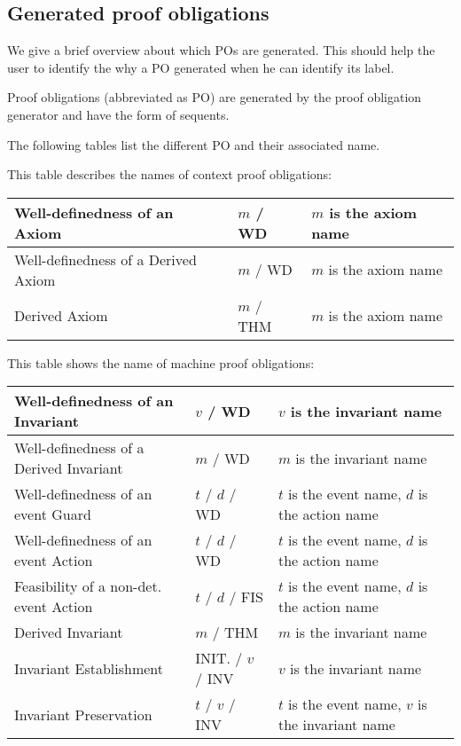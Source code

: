   
\subsection{Generated proof obligations}
\label{ref:generated_proof_obligations}

We give a brief overview about which POs are generated. This should help the user to identify the why a PO generated when he can identify its label.


Proof obligations (abbreviated as PO) are generated by the proof obligation generator and have the form of sequents. 

The following tables list the different PO and their associated name.

This table describes the names of context proof obligations: 

\begin{center}
    \begin{tabular}{| p{6cm} | p{3cm} | p{5cm} |}
    \hline
	Well-definedness of an Axiom & $m$ / WD & $m$ is the axiom name\\ \hline
	Well-definedness of a Derived Axiom & $m$  / WD & $m$ is the axiom name \\ \hline
	Derived Axiom & $m$  / THM & $m$ is the axiom name \\ \hline
    \end{tabular}
\end{center}

This table shows the name of machine proof obligations:

\begin{center}
    \begin{tabular}{| p{6cm} | p{3cm} | p{5cm} |}
    \hline
	Well-definedness of an Invariant & $v$  / WD & $v$ is the invariant name\\ \hline
	Well-definedness of a Derived Invariant & $m$  / WD & $m$ is the invariant name \\ \hline
	Well-definedness of an event Guard & $t$  / $d$  / WD & $t$ is the event name, $d$ is the action name  \\ \hline
	Well-definedness of an event Action & $t$  / $d$  / WD & $t$ is the event name, $d$ is the action name  \\ \hline
	Feasibility of a non-det. event Action & $t$  / $d$  / FIS & $t$ is the event name, $d$ is the action name  \\ \hline
	Derived Invariant & $m$ / THM & $m$ is the invariant name \\ \hline
	Invariant Establishment & INIT.  / $v$  / INV & $v$ is the invariant name  \\ \hline
	Invariant Preservation & $t$  / $v$  / INV & $t$ is the event name, $v$ is the invariant name  \\ \hline
    \end{tabular}
\end{center}


